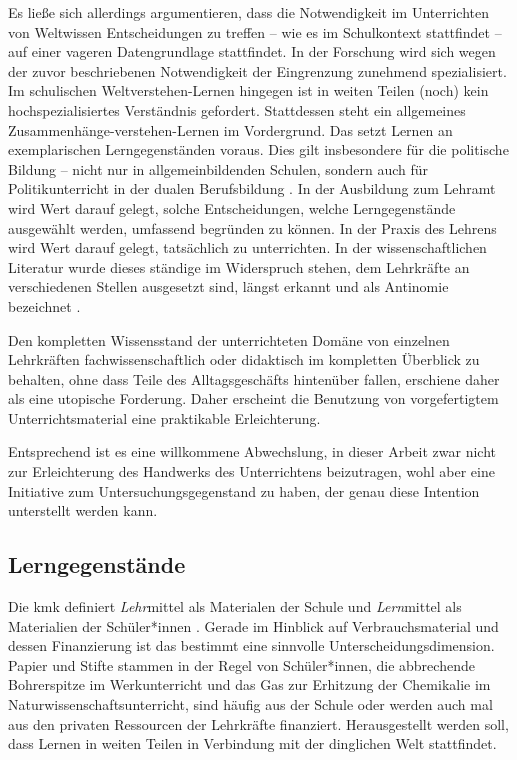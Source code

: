 Es ließe sich allerdings argumentieren, dass die Notwendigkeit im Unterrichten von Weltwissen Entscheidungen zu treffen -- wie es im Schulkontext stattfindet -- auf einer vageren Datengrundlage stattfindet. In der Forschung wird sich wegen der zuvor beschriebenen Notwendigkeit der Eingrenzung zunehmend spezialisiert. Im schulischen Weltverstehen-Lernen hingegen ist in weiten Teilen (noch) kein hochspezialisiertes Verständnis gefordert. Stattdessen steht ein allgemeines Zusammenhänge-verstehen-Lernen im Vordergrund. Das setzt Lernen an exemplarischen Lerngegenständen voraus. 
Dies gilt insbesondere für die politische Bildung -- nicht nur in allgemeinbildenden Schulen, sondern auch für Politikunterricht in der dualen Berufsbildung \autocite[vgl. \gls{abs} \ref{bplan}: \gls{S} \pageref{bplan} \&][4; 9-13]{bplan}.
In der Ausbildung zum Lehramt wird Wert darauf gelegt, solche Entscheidungen, welche Lerngegenstände ausgewählt werden, umfassend begründen zu können. 
In der Praxis des Lehrens wird Wert darauf gelegt, tatsächlich zu unterrichten.
In der wissenschaftlichen Literatur wurde dieses ständige im Widerspruch stehen, dem Lehrkräfte an verschiedenen Stellen ausgesetzt sind, längst erkannt und als Antinomie bezeichnet \autocite[\gls{vgl} \gls{zb}][]{Helsper.2001}.

Den kompletten Wissensstand der unterrichteten Domäne von einzelnen Lehrkräften fachwissenschaftlich oder didaktisch im kompletten Überblick zu behalten, ohne dass Teile des Alltagsgeschäfts hintenüber fallen, erschiene daher als eine utopische Forderung. Daher erscheint die Benutzung von vorgefertigtem Unterrichtsmaterial eine praktikable Erleichterung. 


Entsprechend ist es eine willkommene Abwechslung, in dieser Arbeit zwar nicht zur Erleichterung des Handwerks des Unterrichtens beizutragen, wohl aber eine Initiative zum Untersuchungsgegenstand zu haben, der genau diese Intention unterstellt werden kann. 

\subsection{Lerngegenstände}
Die \gls{kmk} definiert \emph{Lehr}mittel als Materialen der Schule und \emph{Lern}mittel als Materialien der Schüler*innen \autocite{KMKMittel}. Gerade im Hinblick auf Verbrauchsmaterial und dessen Finanzierung ist das bestimmt eine sinnvolle Unterscheidungsdimension. Papier und Stifte stammen in der Regel von Schüler*innen, die abbrechende Bohrerspitze im Werkunterricht und %
das Gas zur Erhitzung der Chemikalie im Naturwissenschaftsunterricht, sind häufig aus der Schule oder werden auch mal aus den privaten Ressourcen der Lehrkräfte finanziert. Herausgestellt werden soll, dass Lernen in weiten Teilen in Verbindung mit der dinglichen Welt stattfindet.

